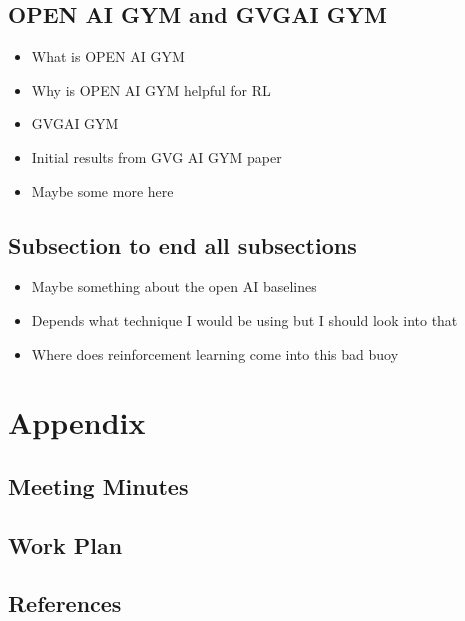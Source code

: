 \documentclass[a4paper]{article}
\begin{document}
\subsection{OPEN AI GYM and GVGAI GYM}
\begin{itemize}
    \item What is OPEN AI GYM
    \item Why is OPEN AI GYM helpful for RL
    \item GVGAI GYM
    \item Initial results from GVG AI GYM paper
    \item Maybe some more here
\end{itemize}\cite{GVGAIGYM}

\subsection{Subsection to end all subsections}
\begin{itemize}
    \item Maybe something about the open AI baselines
    \item Depends what technique I would be using but I should look into that
    \item Where does reinforcement learning come into this bad buoy
\end{itemize}


\pagebreak
\section{Appendix}

\subsection{Meeting Minutes}


\pagebreak
\subsection{Work Plan}


\subsection{References}


\end{document}
